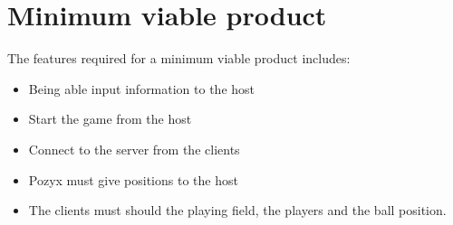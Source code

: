 \section{Minimum viable product}

The features required for a minimum viable product includes:
\begin{itemize}
    \item Being able input information to the host
    \item Start the game from the host
    \item Connect to the server from the clients
    \item Pozyx must give positions to the host
    \item The clients must should the playing field, the players and the ball position.
\end{itemize}

